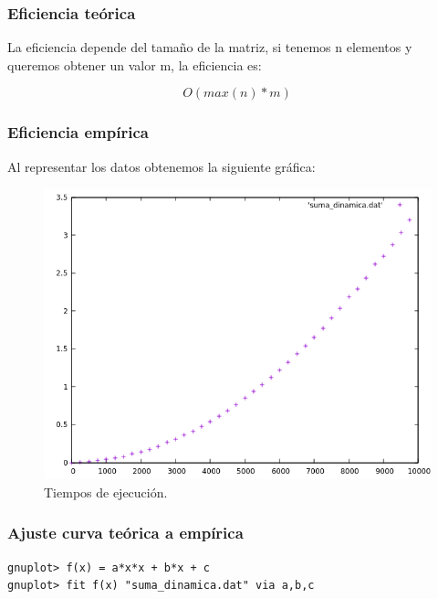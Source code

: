 \subsubsection{Eficiencia teórica}

La eficiencia depende del tamaño de la matriz, si tenemos n elementos y queremos obtener un valor m, la eficiencia es:

  \begin{equation}
      O(max(n)*m)
  \end{equation}

\subsubsection{Eficiencia empírica}

Al representar los datos obtenemos la siguiente gráfica:

\begin{figure}[H]
    \begin{center}
        \includegraphics[scale=0.7]{imagenes/suma_dinamica.png}
        \caption{Tiempos de ejecución.}
        \label{fig19}
    \end{center}
\end{figure}

\subsubsection{Ajuste curva teórica a empírica}

\begin{shaded*}
\begin{verbatim}
gnuplot> f(x) = a*x*x + b*x + c
gnuplot> fit f(x) "suma_dinamica.dat" via a,b,c

\end{verbatim}
\end{shaded*}

